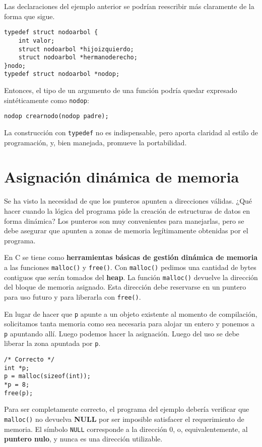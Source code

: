 \begin{ejemplo}
Las declaraciones del ejemplo anterior se podrían reescribir más claramente de
la forma que sigue.
\begin{lstlisting}
typedef struct nodoarbol {
    int valor;
    struct nodoarbol *hijoizquierdo;
    struct nodoarbol *hermanoderecho;
}nodo;
typedef struct nodoarbol *nodop;	
\end{lstlisting}

Entonces, el tipo de un argumento de una función podría quedar expresado
sintéticamente como \lstinline{nodop}:
\begin{lstlisting}
nodop crearnodo(nodop padre);
\end{lstlisting}

La construcción con \lstinline{typedef} no es indispensable, pero aporta claridad al estilo
de programación, y, bien manejada, promueve la portabilidad.
\end{ejemplo}


\section{Asignación dinámica de memoria}
Se ha visto la necesidad de que los punteros apunten a direcciones válidas.
¿Qué hacer cuando la lógica del programa pide la creación de estructuras de
datos en forma dinámica? Los punteros son muy convenientes para manejarlas,
pero se debe asegurar que apunten a zonas de memoria legítimamente obtenidas
por el programa.

En C se tiene como \textbf{herramientas básicas de gestión dinámica de memoria} a las
funciones \lstinline{malloc()} y \lstinline{free()}. Con \lstinline{malloc()} pedimos una cantidad de bytes
contiguos que serán tomados del \textbf{heap}. La función \lstinline{malloc()} devuelve la dirección
del bloque de memoria asignado. Esta dirección debe reservarse en un puntero
para uso futuro y para liberarla con \lstinline{free()}.

\begin{ejemplo}
En lugar de hacer que \lstinline{p} apunte a un objeto existente al momento de compilación,
solicitamos tanta memoria como sea necesaria para alojar un entero y ponemos a
\lstinline{p} apuntando allí. Luego podemos hacer la asignación. Luego del uso se debe
liberar la zona apuntada por \lstinline{p}.
\begin{lstlisting}
/* Correcto */
int *p;
p = malloc(sizeof(int));
*p = 8;
free(p);
\end{lstlisting}
Para ser completamente correcto, el programa del ejemplo debería verificar que \lstinline{malloc()} no
devuelva \textbf{NULL} por ser imposible satisfacer el requerimiento de memoria. El
símbolo \lstinline{NULL} corresponde a la dirección 0, o, equivalentemente, al \textbf{puntero
nulo}, y nunca es una dirección utilizable.
\end{ejemplo}




